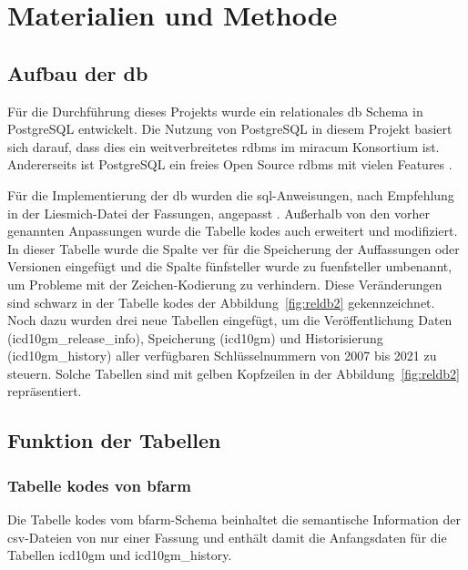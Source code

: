 \chapter{Materialien und Methode} \label{ch:database}

\section{Aufbau der \acs{db}} \label{sec:dbdevelop}

Für die Durchführung dieses Projekts wurde ein relationales \ac{db} Schema in PostgreSQL entwickelt. Die Nutzung von PostgreSQL in diesem Projekt basiert sich darauf, dass dies ein weitverbreitetes \ac{rdbms} im \ac{miracum} Konsortium ist. Andererseits ist PostgreSQL ein freies Open Source \ac{rdbms} mit vielen Features \cite{postgres}.

Für die Implementierung der \ac{db} wurden die \ac{sql}-Anweisungen, nach Empfehlung in der Liesmich-Datei der Fassungen, angepasst \cite{readmel}. Außerhalb von den vorher genannten Anpassungen wurde die Tabelle \glqq\textsf{kodes}\grqq{} auch erweitert und modifiziert. In dieser Tabelle wurde die Spalte \glqq\textsf{ver}\grqq{} für die Speicherung der Auffassungen oder Versionen eingefügt und die Spalte \glqq\textsf{fünfsteller}\grqq{} wurde zu \glqq\textsf{fuenfsteller}\grqq{} umbenannt, um Probleme mit der Zeichen-Kodierung zu verhindern. Diese Veränderungen sind schwarz in der Tabelle \glqq\textsf{kodes}\grqq{} der Abbildung~\ref{fig:reldb2} gekennzeichnet. Noch dazu wurden drei neue Tabellen eingefügt, um die Veröffentlichung Daten (\glqq\textsf{icd10gm\_release\_info}\grqq{}), Speicherung (\glqq\textsf{icd10gm}\grqq{}) und Historisierung (\glqq\textsf{icd10gm\_history}\grqq{}) aller verfügbaren Schlüsselnummern von 2007 bis 2021 zu steuern. Solche Tabellen sind mit gelben Kopfzeilen in der Abbildung~\ref{fig:reldb2} repräsentiert.

\section{Funktion der Tabellen} \label{sec:functab}

\subsection{Tabelle \glqq\textsf{kodes}\grqq{} von \acs{bfarm}} \label{subsec:bfarmtables}

Die Tabelle \glqq\textsf{kodes}\grqq{} vom \ac{bfarm}-Schema beinhaltet die semantische Information der \ac{csv}-Dateien von nur einer Fassung und enthält damit die Anfangsdaten für die Tabellen \glqq\textsf{icd10gm}\grqq{} und \glqq\textsf{icd10gm\_history}\grqq{}.

